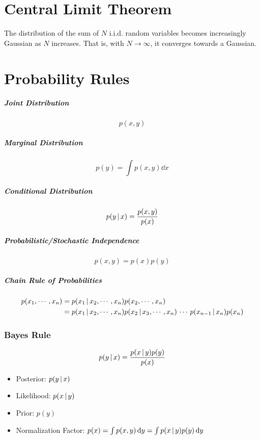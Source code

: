 	\section{Central Limit Theorem}
		The distribution of the sum of \(N\) i.i.d. random variables becomes increasingly Gaussian as \(N\) increases. That is, with \(N \to \infty\), it converges towards a Gaussian.

	\section{Probability Rules}
		\subparagraph{Joint Distribution}
			\begin{equation}
				p(x, y)
			\end{equation}

		\subparagraph{Marginal Distribution}
			\begin{equation}
				p(y) = \int p(x, y) \dd{x}
			\end{equation}

		\subparagraph{Conditional Distribution}
			\begin{equation}
				p(y \,\vert\, x) = \frac{p(x, y)}{p(x)}
			\end{equation}

		\subparagraph{Probabilistic/Stochastic Independence}
			\begin{equation}
				p(x, y) = p(x) p(y)
			\end{equation}

		\subparagraph{Chain Rule of Probabilities}
			\begin{align}
				p(x_1, \cdots, x_n) & = p(x_1 \,\vert\, x_2, \cdots, x_n) p(x_2, \cdots, x_n)                                                      \\
				                    & = p(x_1 \,\vert\, x_2, \cdots, x_n) p(x_2 \,\vert\, x_3, \cdots, x_n) \,\cdots\, p(x_{n - 1} \,\vert\, x_n) p(x_n)
			\end{align}

		\subsubsection{Bayes Rule}
			\begin{equation}
				p(y \,\vert\, x) = \frac{p(x \,\vert\, y) p(y)}{p(x)}
			\end{equation}

			\begin{itemize}
				\item Posterior: \tabto{4cm} \( p(y \,\vert\, x) \)
				\item Likelihood: \tabto{4cm} \( p(x \,\vert\, y) \)
				\item Prior: \tabto{4cm} \( p(y) \)
				\item Normalization Factor: \tabto{4cm} \( p(x) = \int p(x, y) \dd{y} = \int p(x \,\vert\, y) p(y) \dd{y} \)
			\end{itemize}

